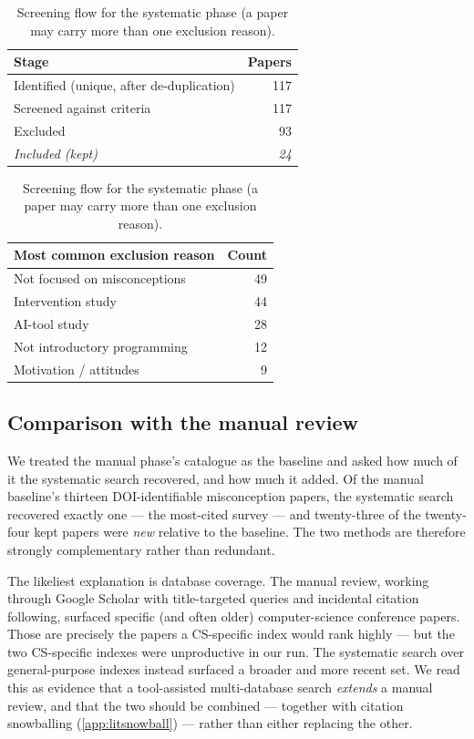 \begin{table}[h]
  \centering
  \begin{tabular}{lr}
    \toprule
    Stage & Papers \\
    \midrule
    Identified (unique, after de-duplication) & 117 \\
    Screened against criteria                 & 117 \\
    Excluded                                  & 93 \\
    \emph{Included (kept)}                     & \emph{24} \\
    \bottomrule
  \end{tabular}
  \quad
  \begin{tabular}{lr}
    \toprule
    Most common exclusion reason & Count \\
    \midrule
    Not focused on misconceptions & 49 \\
    Intervention study            & 44 \\
    AI-tool study                 & 28 \\
    Not introductory programming  & 12 \\
    Motivation / attitudes        & 9 \\
    \bottomrule
  \end{tabular}
  \caption{Screening flow for the systematic phase (a paper may carry more than
    one exclusion reason).}
  \label{tab:litscreening}
\end{table}

\subsection{Comparison with the manual review}
\label{app:litcomparison}

We treated the manual phase's catalogue as the baseline and asked how much of it
the systematic search recovered, and how much it added. Of the manual baseline's
thirteen DOI-identifiable misconception papers, the systematic search recovered
exactly one --- the most-cited survey \autocite{MisconceptionsSurvey2017} ---
and twenty-three of the twenty-four kept papers were \emph{new} relative to the
baseline. The two methods are therefore strongly complementary rather than
redundant.

The likeliest explanation is database coverage. The manual review, working
through Google Scholar with title-targeted queries and incidental citation
following, surfaced specific (and often older) computer-science conference
papers. Those are precisely the papers a CS-specific index would rank highly ---
but the two CS-specific indexes were unproductive in our run. The systematic
search over general-purpose indexes instead surfaced a broader and more recent
set. We read this as evidence that a tool-assisted multi-database search
\emph{extends} a manual review, and that the two should be combined ---
together with citation snowballing (\cref{app:litsnowball}) --- rather than
either replacing the other.

